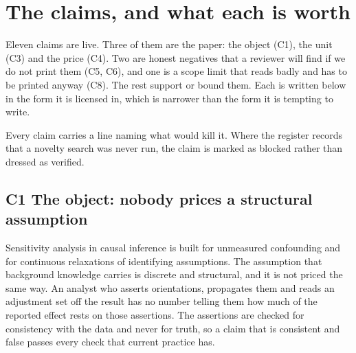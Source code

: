 \section{The claims, and what each is worth}

Eleven claims are live. Three of them are the paper: the object (C1), the unit (C3) and the price
(C4). Two are honest negatives that a reviewer will find if we do not print them (C5, C6), and one
is a scope limit that reads badly and has to be printed anyway (C8). The rest support or bound
them. Each is written below in the form it is licensed in, which is narrower than the form it is
tempting to write.

Every claim carries a line naming what would kill it. Where the register records that a novelty
search was never run, the claim is marked as blocked rather than dressed as verified.

\subsection*{C1 \quad The object: nobody prices a structural assumption}

Sensitivity analysis in causal inference is built for unmeasured confounding and for continuous
relaxations of identifying assumptions. The assumption that background knowledge carries is
discrete and structural, and it is not priced the same way. An analyst who asserts orientations,
propagates them and reads an adjustment set off the result has no number telling them how much of
the reported effect rests on those assertions. The assertions are checked for consistency with the
data and never for truth, so a claim that is consistent and false passes every check that current
practice has.


